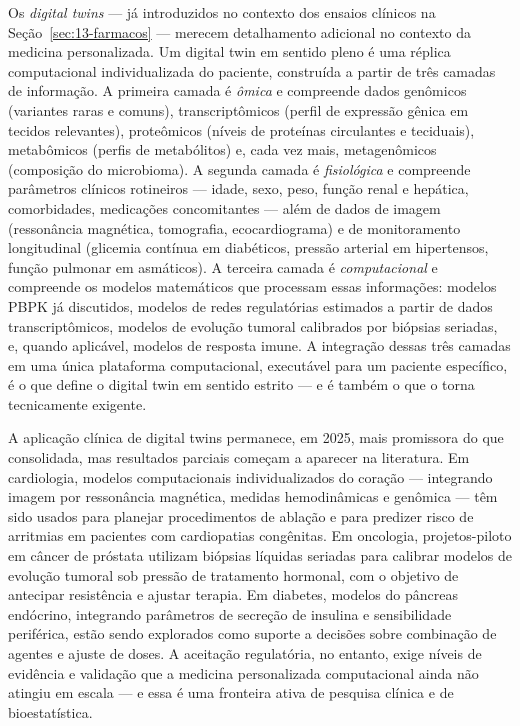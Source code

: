 Os \emph{digital twins} --- já introduzidos no contexto dos ensaios clínicos na Seção~\ref{sec:13-farmacos} --- merecem detalhamento adicional no contexto da medicina personalizada. Um digital twin em sentido pleno é uma réplica computacional individualizada do paciente, construída a partir de três camadas de informação. A primeira camada é \emph{ômica} e compreende dados genômicos (variantes raras e comuns), transcriptômicos (perfil de expressão gênica em tecidos relevantes), proteômicos (níveis de proteínas circulantes e teciduais), metabômicos (perfis de metabólitos) e, cada vez mais, metagenômicos (composição do microbioma). A segunda camada é \emph{fisiológica} e compreende parâmetros clínicos rotineiros --- idade, sexo, peso, função renal e hepática, comorbidades, medicações concomitantes --- além de dados de imagem (ressonância magnética, tomografia, ecocardiograma) e de monitoramento longitudinal (glicemia contínua em diabéticos, pressão arterial em hipertensos, função pulmonar em asmáticos). A terceira camada é \emph{computacional} e compreende os modelos matemáticos que processam essas informações: modelos PBPK já discutidos, modelos de redes regulatórias estimados a partir de dados transcriptômicos, modelos de evolução tumoral calibrados por biópsias seriadas, e, quando aplicável, modelos de resposta imune. A integração dessas três camadas em uma única plataforma computacional, executável para um paciente específico, é o que define o digital twin em sentido estrito --- e é também o que o torna tecnicamente exigente.

A aplicação clínica de digital twins permanece, em 2025, mais promissora do que consolidada, mas resultados parciais começam a aparecer na literatura. Em cardiologia, modelos computacionais individualizados do coração --- integrando imagem por ressonância magnética, medidas hemodinâmicas e genômica --- têm sido usados para planejar procedimentos de ablação e para predizer risco de arritmias em pacientes com cardiopatias congênitas. Em oncologia, projetos-piloto em câncer de próstata utilizam biópsias líquidas seriadas para calibrar modelos de evolução tumoral sob pressão de tratamento hormonal, com o objetivo de antecipar resistência e ajustar terapia. Em diabetes, modelos do pâncreas endócrino, integrando parâmetros de secreção de insulina e sensibilidade periférica, estão sendo explorados como suporte a decisões sobre combinação de agentes e ajuste de doses. A aceitação regulatória, no entanto, exige níveis de evidência e validação que a medicina personalizada computacional ainda não atingiu em escala --- e essa é uma fronteira ativa de pesquisa clínica e de bioestatística.

